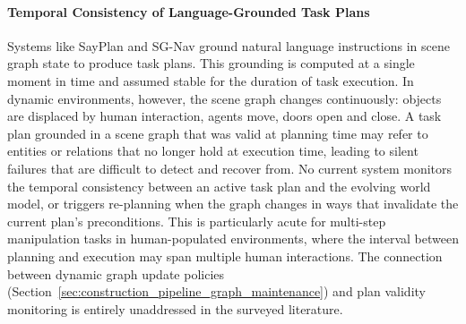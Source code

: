 \paragraph{Temporal Consistency of Language-Grounded Task Plans}
Systems like SayPlan \cite{rana2023sayplangroundinglargelanguage} and SG-Nav \cite{yin2024sgnav} ground natural language instructions in scene graph state to produce task plans. 
This grounding is computed at a single moment in time and assumed stable for the duration of task execution. 
In dynamic environments, however, the scene graph changes continuously: objects are displaced by human interaction, agents move, doors open and close. 
A task plan grounded in a scene graph that was valid at planning time may refer to entities or relations that no longer hold at execution time, leading to silent failures that are difficult to detect and recover from. 
No current system monitors the temporal consistency between an active task plan and the evolving world model, or triggers re-planning when the graph changes in ways that invalidate the current plan's preconditions. 
This is particularly acute for multi-step manipulation tasks in human-populated environments, where the interval between planning and execution may span multiple human interactions. 
The connection between dynamic graph update policies (Section~\ref{sec:construction_pipeline_graph_maintenance}) and plan validity monitoring is entirely unaddressed in the surveyed literature.


